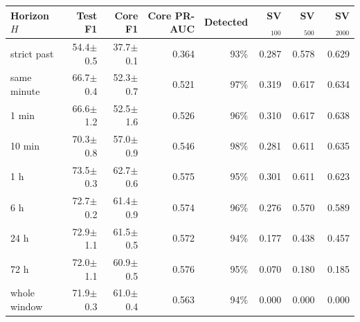 \begin{tabular}{lrrrrrrr}
\toprule
Horizon $H$ & Test F1 & Core F1 & Core PR-AUC & Detected & SV$_{100}$ & SV$_{500}$ & SV$_{2000}$ \\
\midrule
strict past & 54.4$\pm$0.5 & 37.7$\pm$0.1 & 0.364 & 93\% & 0.287 & 0.578 & 0.629 \\
same minute & 66.7$\pm$0.4 & 52.3$\pm$0.7 & 0.521 & 97\% & 0.319 & 0.617 & 0.634 \\
1 min & 66.6$\pm$1.2 & 52.5$\pm$1.6 & 0.526 & 96\% & 0.310 & 0.617 & 0.638 \\
10 min & 70.3$\pm$0.8 & 57.0$\pm$0.9 & 0.546 & 98\% & 0.281 & 0.611 & 0.635 \\
1 h & 73.5$\pm$0.3 & 62.7$\pm$0.6 & 0.575 & 95\% & 0.301 & 0.611 & 0.623 \\
6 h & 72.7$\pm$0.2 & 61.4$\pm$0.9 & 0.574 & 96\% & 0.276 & 0.570 & 0.589 \\
24 h & 72.9$\pm$1.1 & 61.5$\pm$0.5 & 0.572 & 94\% & 0.177 & 0.438 & 0.457 \\
72 h & 72.0$\pm$1.1 & 60.9$\pm$0.5 & 0.576 & 95\% & 0.070 & 0.180 & 0.185 \\
whole window & 71.9$\pm$0.3 & 61.0$\pm$0.4 & 0.563 & 94\% & 0.000 & 0.000 & 0.000 \\
\bottomrule
\end{tabular}